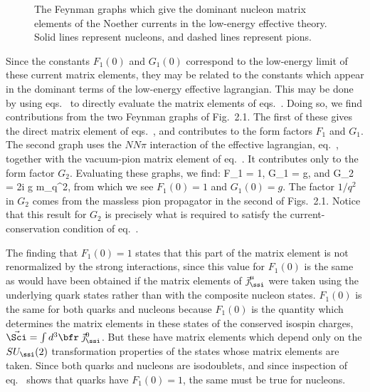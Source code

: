 \begin{figure}
\vspace{1in}
\caption{The Feynman graphs which give the dominant nucleon
matrix elements of the Noether currents in the low-energy
effective theory. Solid lines represent nucleons, and
dashed lines represent pions.}
\end{figure}


Since the constants $F_1(0)$ and $G_1(0)$ correspond to the
low-energy limit of these current matrix elements, they may
be related to the constants which appear in the dominant
terms of the low-energy effective lagrangian. This may be
done by using 
eqs.~ to directly evaluate the matrix
elements of eqs.~. Doing so, we
find contributions from the two Feynman graphs of Fig.~2.1.
The first of these gives the direct matrix element of
eqs.~, and contributes to the form
factors $F_1$ and $G_1$. The second graph uses the $NN\pi$
interaction of the effective lagrangian,
eq.~, together with the vacuum-pion
matrix element of eq.~. It
contributes only to the form factor $G_2$. Evaluating these
graphs, we find:
%
\eq
\label{formfactorpredictions}
F_1 = 1, \qquad G_1 = g, \qquad \hbox{and} 
\qquad G_2 = {2i g  m_\ssn \over q^2},
\eeq
%
from which we see $F_1(0) = 1$ and $G_1(0) = g$. The factor
$1/q^2$ in $G_2$ comes from the massless pion propagator in
the second of Figs.~2.1. Notice that this result for $G_2$
is precisely what is required to satisfy the
current-conservation condition of
eq.~.

The finding that $F_1(0) = 1$ states that this part of the
matrix element is not renormalized by the strong
interactions, since this value for $F_1(0)$ is the same as
would have been obtained if the matrix elements of
$\vec\jmath^\mu_\ssi$ were taken using the underlying quark
states rather than with the composite nucleon states.
$F_1(0)$ is the same for both quarks and nucleons because
$F_1(0)$ is the quantity which determines the matrix
elements in these states of the conserved isospin charges,
$\vec \Sci = \int 
d^3\bfr \; \vec\jmath^0_\ssi$. But these have matrix
elements which depend only on the $SU_\ssi(2)$
transformation properties of the states whose matrix
elements are taken. Since both quarks and nucleons are
isodoublets, and since inspection of 
eq.~ shows that quarks have $F_1(0) =
1$, the same must be true for nucleons.

